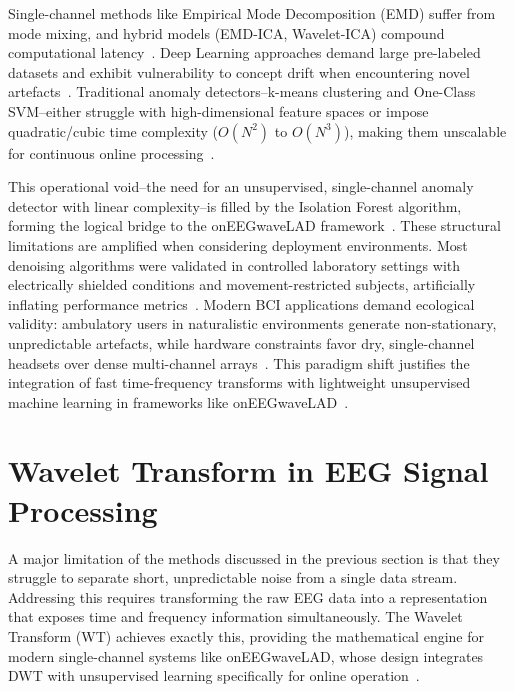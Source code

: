\documentclass[MScCS,12pt,oneside,final]{uccthesis}
\begin{document}
Single-channel methods like Empirical Mode Decomposition (EMD) suffer from mode mixing, and hybrid models (EMD-ICA, Wavelet-ICA) compound computational latency~\parencite{huang1998empirical}. Deep Learning approaches demand large pre-labeled datasets and exhibit vulnerability to concept drift when encountering novel artefacts~\parencite{zhang2021deep, craik2019deep, gama2014survey}. Traditional anomaly detectors--k-means clustering and One-Class SVM--either struggle with high-dimensional feature spaces or impose quadratic/cubic time complexity ($O(N^2)$ to $O(N^3)$), making them unscalable for continuous online processing~\parencite{scholkopf2001estimating}.

This operational void--the need for an unsupervised, single-channel anomaly detector with linear complexity--is filled by the Isolation Forest algorithm, forming the logical bridge to the onEEGwaveLAD framework~\parencite{chandola2009anomaly, longo2025oneegwavelad}. These structural limitations are amplified when considering deployment environments. Most denoising algorithms were validated in controlled laboratory settings with electrically shielded conditions and movement-restricted subjects, artificially inflating performance metrics~\parencite{mullen2015real}. Modern BCI applications demand ecological validity: ambulatory users in naturalistic environments generate non-stationary, unpredictable artefacts, while hardware constraints favor dry, single-channel headsets over dense multi-channel arrays~\parencite{jiang2019removal}. This paradigm shift justifies the integration of fast time-frequency transforms with lightweight unsupervised machine learning in frameworks like onEEGwaveLAD~\parencite{longo2025oneegwavelad}.

   \section{Wavelet Transform in EEG Signal Processing}
   \label{sec:wavelet_transform}
    
    A major limitation of the methods discussed in the previous section is that they struggle to separate short, unpredictable noise from a single data stream. Addressing this requires transforming the raw EEG data into a representation that exposes time and frequency information simultaneously. The Wavelet Transform (WT) achieves exactly this, providing the mathematical engine for modern single-channel systems like onEEGwaveLAD, whose design integrates DWT with unsupervised learning specifically for online operation~\parencite{longo2025oneegwavelad, longo2026framework}.
\end{document}
